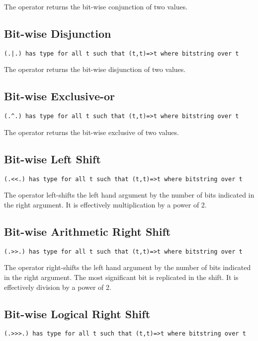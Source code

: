 The  operator returns the bit-wise conjunction of two values.

\subsection{ Bit-wise Disjunction}
\label{bitOr}
\begin{lstlisting}
(.|.) has type for all t such that (t,t)=>t where bitstring over t
\end{lstlisting}

The  operator returns the bit-wise disjunction of two values.

\subsection{ Bit-wise Exclusive-or}
\label{bitXor}
\begin{lstlisting}
(.^.) has type for all t such that (t,t)=>t where bitstring over t
\end{lstlisting}

The  operator returns the bit-wise exclusive of two values.

\subsection{ Bit-wise Left Shift}
\label{bitLeft}
\begin{lstlisting}
(.<<.) has type for all t such that (t,t)=>t where bitstring over t
\end{lstlisting}

The  operator left-shifts the left hand argument by the number of bits indicated in the right argument. It is effectively multiplication by a power of 2.

\subsection{ Bit-wise Arithmetic Right Shift}
\label{bitRight}
\begin{lstlisting}
(.>>.) has type for all t such that (t,t)=>t where bitstring over t
\end{lstlisting}

The  operator right-shifts the left hand argument by the number of bits indicated in the right argument. The most significant bit is replicated in the shift. It is effectively division by a power of 2.

\subsection{ Bit-wise Logical Right Shift}
\label{bitRightLogic}
\begin{lstlisting}
(.>>>.) has type for all t such that (t,t)=>t where bitstring over t
\end{lstlisting}


